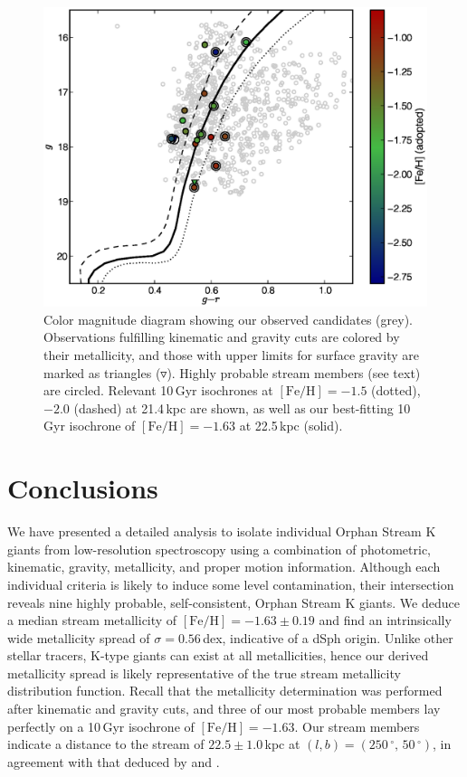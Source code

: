 \documentclass[10pt,apjl]{emulateapj}
\begin{document}
\begin{figure}[h!]
	\includegraphics[width=\columnwidth]{./fig4.eps}
	\caption{Color magnitude diagram showing our observed candidates (grey). Observations fulfilling kinematic and gravity cuts are colored by their metallicity, and those with upper limits for surface gravity are marked as triangles ($\triangledown$). Highly probable stream members (see text) are circled. Relevant 10\,Gyr \citet{Girardi_et-al_2008} isochrones at $[\mbox{Fe/H}] = -1.5$ (dotted), $-2.0$ (dashed) at 21.4\,kpc \citep{Newberg_et-al_2010} are shown, as well as our best-fitting 10\,Gyr isochrone of $[\mbox{Fe/H}] = -1.63$ at 22.5\,kpc (solid).}
	\label{fig:cmd}
\end{figure}

\newpage

\section{Conclusions}
\label{sec:conclusions}

We have presented a detailed analysis to isolate individual Orphan Stream K giants from low-resolution spectroscopy using a combination of photometric, kinematic, gravity, metallicity, and proper motion information. Although each individual criteria is likely to induce some level contamination, their intersection reveals nine highly probable, self-consistent, Orphan Stream K giants.  We deduce a median stream metallicity of $[\mbox{Fe/H}] = -1.63 \pm 0.19$ and find an intrinsically wide metallicity spread of $\sigma = 0.56$\,dex, indicative of a dSph origin. Unlike other stellar tracers, K-type giants can exist at all metallicities, hence our derived metallicity spread is likely representative of the true stream metallicity distribution function. Recall that the metallicity determination was performed after kinematic and gravity cuts, and three of our most probable members lay perfectly on a 10\,Gyr isochrone of $[\mbox{Fe/H}] = -1.63$. Our stream members indicate a distance to the stream of $22.5 \pm 1.0$\,kpc at $(l, b) = (250\,^\circ,\,50\,^\circ)$, in agreement with that deduced by \citet{Grillmair;et-al_2006} and \citet{Newberg_et-al_2010}.
\end{document}
